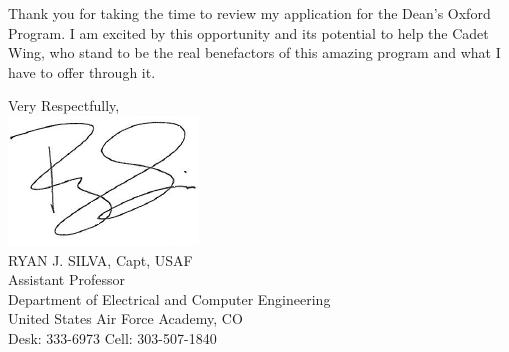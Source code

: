 \documentclass{article}
\begin{document}
Thank you for taking the time to review my application for the Dean's Oxford Program. I am
excited by this opportunity and its potential to help the Cadet Wing, who stand to 
be the real benefactors of this amazing program and what I have to offer through it.

\hspace*{2.3in} \noindent Very Respectfully, \\
\hspace*{2.5in} \includegraphics[scale=.5]{silvasig}  \\
\hspace*{2.5in} RYAN J. SILVA, Capt, USAF \\
\hspace*{2.5in} Assistant Professor   \\
\hspace*{2.5in} Department of Electrical and Computer Engineering  \\
\hspace*{2.5in} United States Air Force Academy, CO \\ 
\hspace*{2.5in} Desk: 333-6973 Cell: 303-507-1840

\renewcommand\cfttoctitlefont{\small}
\renewcommand\cftsecfont{\small}
\renewcommand\cftsubsecfont{\small}
\renewcommand\cftsecpagefont{\small}
\renewcommand\cftsubsecpagefont{\small}
\renewcommand\cftsecafterpnum{\setstretch{0.1}}
\renewcommand\cftsubsecafterpnum{\setstretch{0.1}}
\renewcommand\contentsname{\bf Attachments}\tableofcontents

\newpage
\end{document}
